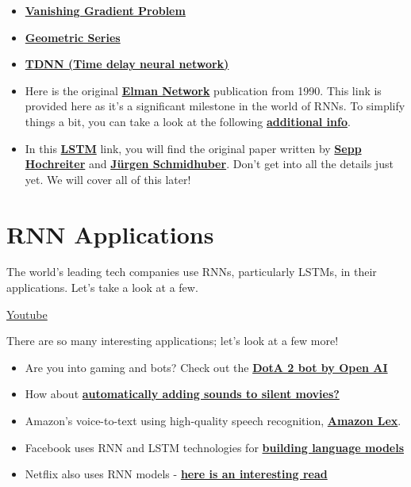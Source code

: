 \begin{itemize}
    \item \href{https://en.wikipedia.org/wiki/Vanishing_gradient_problem}{\textbf{Vanishing Gradient Problem}}
    \item \href{https://socratic.org/algebra/exponents-and-exponential-functions/geometric-sequences-and-exponential-functions}{\textbf{Geometric Series}}
    \item \href{https://en.wikipedia.org/wiki/Time_delay_neural_network}{\textbf{TDNN (Time delay neural network)}}
    \item Here is the original \href{http://onlinelibrary.wiley.com/doi/10.1207/s15516709cog1402_1/abstract}{\textbf{Elman Network}} publication from 1990. This link is provided here as it's a significant milestone in the world of RNNs. To simplify things a bit, you can take a look at the following \href{https://en.wikipedia.org/wiki/Recurrent_neural_network\#Elman_networks_and_Jordan_networks}{\textbf{additional info}}.
    \item In this \href{http://www.bioinf.jku.at/publications/older/2604.pdf}{\textbf{LSTM}} link, you will find the original paper written by \href{https://en.wikipedia.org/wiki/Sepp_Hochreiter}{\textbf{Sepp Hochreiter}} and \href{http://people.idsia.ch/~juergen/}{\textbf{Jürgen Schmidhuber}}. Don't get into all the details just yet. We will cover all of this later!
\end{itemize}


\section{RNN Applications}

The world's leading tech companies use RNNs, particularly LSTMs, in their applications. Let's take a look at a few. \newline

\href{https://www.youtube.com/watch?v=6JbTNARuKII&ab_channel=Udacity}{Youtube}

There are so many interesting applications; let's look at a few more!

\begin{itemize}
    \item Are you into gaming and bots? Check out the \href{https://openai.com/research/dota-2}{\textbf{DotA 2 bot by Open AI}}
    \item How about \href{https://www.youtube.com/watch?time_continue=1&v=0FW99AQmMc8}{\textbf{automatically adding sounds to silent movies?}}
    \item Amazon's voice-to-text using high-quality speech recognition, \href{https://aws.amazon.com/lex/faqs/}{\textbf{Amazon Lex}}.
    \item Facebook uses RNN and LSTM technologies for \href{https://code.facebook.com/posts/1827693967466780/building-an-efficient-neural-language-model-over-a-billion-words/}{\textbf{building language models}}
    \item Netflix also uses RNN models - \href{https://arxiv.org/pdf/1511.06939.pdf}{\textbf{here is an interesting read}}
\end{itemize}

